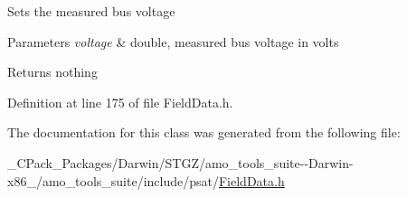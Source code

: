 Sets the measured bus voltage


\begin{DoxyParams}{Parameters}
{\em voltage} & double, measured bus voltage in volts\\
\hline
\end{DoxyParams}
\begin{DoxyReturn}{Returns}
nothing 
\end{DoxyReturn}


Definition at line 175 of file Field\+Data.\+h.



The documentation for this class was generated from the following file\+:\begin{DoxyCompactItemize}
\item 
\+\_\+\+C\+Pack\+\_\+\+Packages/\+Darwin/\+S\+T\+G\+Z/amo\+\_\+tools\+\_\+suite-\/-\/\+Darwin-\/x86\+\_/amo\+\_\+tools\+\_\+suite/include/psat/\hyperlink{___c_pack___packages_2_darwin_2_s_t_g_z_2amo__tools__suite--_darwin-x86__64_2amo__tools__suite_2include_2psat_2_field_data_8h}{Field\+Data.\+h}\end{DoxyCompactItemize}
